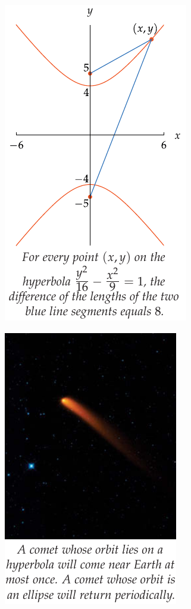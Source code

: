 \documentclass{beamer}
\begin{document}
\begin{frame}
  \begin{figure}
    \centering 
    \includegraphics[scale=0.4]{hyperbola3.png}
  \end{figure}
\end{frame}
\begin{frame}
  \begin{figure}
    \centering 
    \includegraphics[scale=0.5]{hyperbola1.png}
  \end{figure}
\end{frame}
\end{document}
